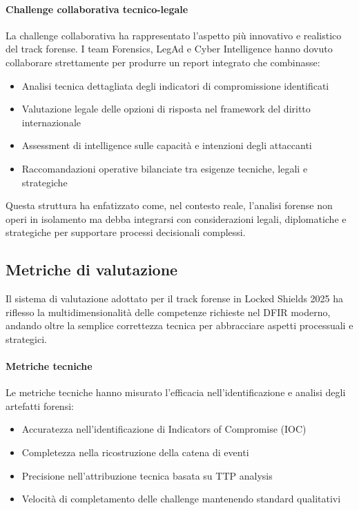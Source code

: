 \paragraph{Challenge collaborativa tecnico-legale}
La challenge collaborativa ha rappresentato l'aspetto più innovativo e realistico del track forense. I team Forensics, LegAd e Cyber Intelligence hanno dovuto collaborare strettamente per produrre un report integrato che combinasse:
\begin{itemize}
    \item Analisi tecnica dettagliata degli indicatori di compromissione identificati
    \item Valutazione legale delle opzioni di risposta nel framework del diritto internazionale
    \item Assessment di intelligence sulle capacità e intenzioni degli attaccanti
    \item Raccomandazioni operative bilanciate tra esigenze tecniche, legali e strategiche
\end{itemize}

Questa struttura ha enfatizzato come, nel contesto reale, l'analisi forense non operi in isolamento ma debba integrarsi con considerazioni legali, diplomatiche e strategiche per supportare processi decisionali complessi.

\subsection{Metriche di valutazione}

Il sistema di valutazione adottato per il track forense in Locked Shields 2025 ha riflesso la multidimensionalità delle competenze richieste nel DFIR moderno, andando oltre la semplice correttezza tecnica per abbracciare aspetti processuali e strategici.

\paragraph{Metriche tecniche}
Le metriche tecniche hanno misurato l'efficacia nell'identificazione e analisi degli artefatti forensi:
\begin{itemize}
    \item Accuratezza nell'identificazione di Indicators of Compromise (IOC)
    \item Completezza nella ricostruzione della catena di eventi
    \item Precisione nell'attribuzione tecnica basata su TTP analysis
    \item Velocità di completamento delle challenge mantenendo standard qualitativi
\end{itemize}

